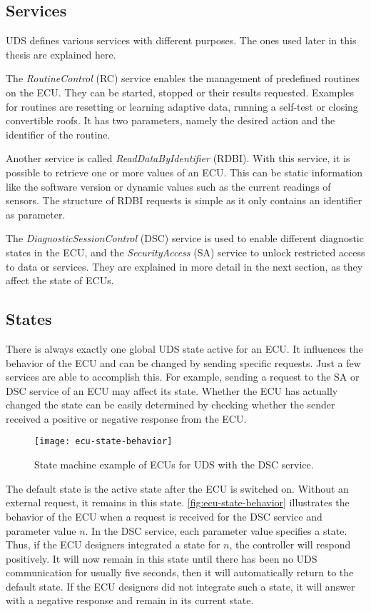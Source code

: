 \subsection{Services}
\label{subsubsec:uds-services}

UDS defines various services with different purposes. The ones used later in this thesis are explained here.

The \emph{RoutineControl} (RC) service enables the management of predefined routines on the ECU. They can be started, stopped or their results requested. Examples for routines are resetting or learning adaptive data, running a self-test or closing convertible roofs. It has two parameters, namely the desired action and the identifier of the routine.

Another service is called \emph{ReadDataByIdentifier} (RDBI). With this service, it is possible to retrieve one or more values of an ECU. This can be static information like the software version or dynamic values such as the current readings of sensors. The structure of RDBI requests is simple as it only contains an identifier as parameter.

The \emph{DiagnosticSessionControl} (DSC) service is used to enable different diagnostic states in the ECU, and the \emph{SecurityAccess} (SA) service to unlock restricted access to data or services. They are explained in more detail in the next section, as they affect the state of ECUs.

\subsection{States}
\label{subsec:states}

There is always exactly one global UDS state active for an ECU. It influences the behavior of the ECU and can be changed by sending specific requests. Just a few services are able to accomplish this. For example, sending a request to the SA or DSC service of an ECU may affect its state. Whether the ECU has actually changed the state can be easily determined by checking whether the sender received a positive or negative response from the ECU.

\begin{figure}[htb]
    \centering
    \texttt{[image: ecu-state-behavior]}
    \caption{State machine example of ECUs for UDS with the DSC service.}
    \label{fig:ecu-state-behavior}
\end{figure}

The default state is the active state after the ECU is switched on. Without an external request, it remains in this state. \autoref{fig:ecu-state-behavior} illustrates the behavior of the ECU when a request is received for the DSC service and parameter value $n$. In the DSC service, each parameter value specifies a state. Thus, if the ECU designers integrated a state for $n$, the controller will respond positively. It will now remain in this state until there has been no UDS communication for usually five seconds, then it will automatically return to the default state. If the ECU designers did not integrate such a state, it will answer with a negative response and remain in its current state.

